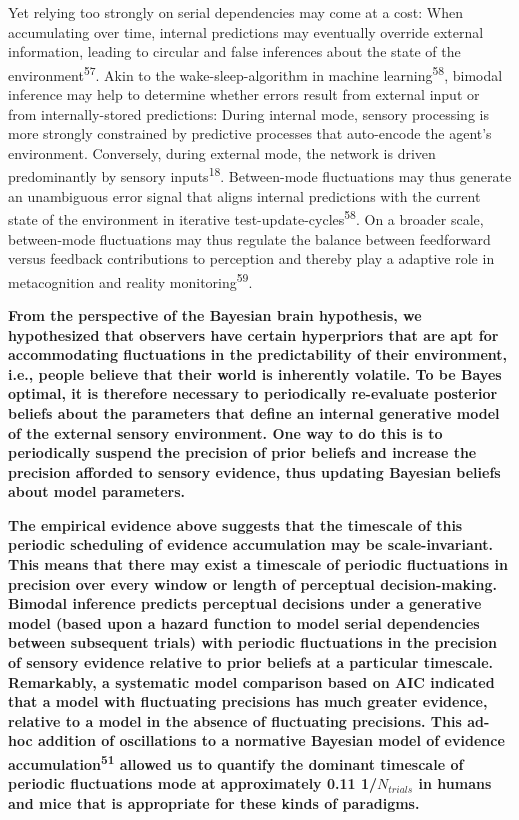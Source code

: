\documentclass[
]{article}
\begin{document}
Yet relying too strongly on serial dependencies may come at a cost: When
accumulating over time, internal predictions may eventually override
external information, leading to circular and false inferences about the
state of the environment\textsuperscript{57}. Akin to the
wake-sleep-algorithm in machine learning\textsuperscript{58}, bimodal
inference may help to determine whether errors result from external
input or from internally-stored predictions: During internal mode,
sensory processing is more strongly constrained by predictive processes
that auto-encode the agent's environment. Conversely, during external
mode, the network is driven predominantly by sensory
inputs\textsuperscript{18}. Between-mode fluctuations may thus generate
an unambiguous error signal that aligns internal predictions with the
current state of the environment in iterative
test-update-cycles\textsuperscript{58}. On a broader scale, between-mode
fluctuations may thus regulate the balance between feedforward versus
feedback contributions to perception and thereby play a adaptive role in
metacognition and reality monitoring\textsuperscript{59}.

\textbf{From the perspective of the Bayesian brain hypothesis, we
hypothesized that observers have certain hyperpriors that are apt for
accommodating fluctuations in the predictability of their environment,
i.e., people believe that their world is inherently volatile. To be
Bayes optimal, it is therefore necessary to periodically re-evaluate
posterior beliefs about the parameters that define an internal
generative model of the external sensory environment. One way to do this
is to periodically suspend the precision of prior beliefs and increase
the precision afforded to sensory evidence, thus updating Bayesian
beliefs about model parameters.}

\textbf{The empirical evidence above suggests that the timescale of this
periodic scheduling of evidence accumulation may be scale-invariant.
This means that there may exist a timescale of periodic fluctuations in
precision over every window or length of perceptual decision-making.
Bimodal inference predicts perceptual decisions under a generative model
(based upon a hazard function to model serial dependencies between
subsequent trials) with periodic fluctuations in the precision of
sensory evidence relative to prior beliefs at a particular timescale.
Remarkably, a systematic model comparison based on AIC indicated that a
model with fluctuating precisions has much greater evidence, relative to
a model in the absence of fluctuating precisions. This ad-hoc addition
of oscillations to a normative Bayesian model of evidence
accumulation\textsuperscript{51} allowed us to quantify the dominant
timescale of periodic fluctuations mode at approximately 0.11
1/\(N_{trials}\) in humans and mice that is appropriate for these kinds
of paradigms.}
\end{document}
